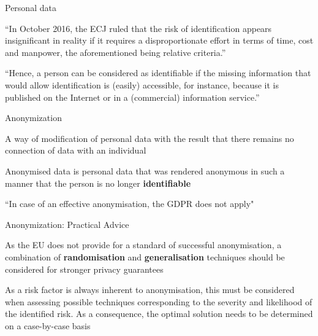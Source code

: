 \documentclass[12pt,aspectratio=169,handout]{beamer}
\begin{document}
\begin{frame}{Personal data}

``In October 2016, the ECJ ruled that the risk of identification appears insignificant in reality if it requires a disproportionate effort in terms of time, cost and manpower, the aforementioned being relative criteria.''

``Hence, a person can be considered as identifiable if the missing information that would allow identification is (easily) accessible, for instance, because it is published on the Internet or in a (commercial) information service.''

\citep[p.~12]{Voigt.Bussche.2017}

\end{frame}



\begin{frame}{Anonymization}

A way of modification of personal data with the result that there remains no connection of data with an individual

Anonymised data is personal data that was rendered anonymous in such a manner that the person is no longer \textbf{identifiable}

``In case of an effective anonymisation, the GDPR does not apply"

\citep[p.~13]{Voigt.Bussche.2017}

\end{frame}



\begin{frame}{Anonymization: Practical Advice}

As the EU does not provide for a standard of successful anonymisation, a combination of \textbf{randomisation} and \textbf{generalisation} techniques should be considered for stronger privacy guarantees

As a risk factor is always inherent to anonymisation, this must be considered when assessing possible techniques corresponding to the severity and likelihood of the identified risk. As a consequence, the optimal solution needs to be determined on a case-by-case basis

\citep[p.~14]{Voigt.Bussche.2017}

\end{frame}
\end{document}
